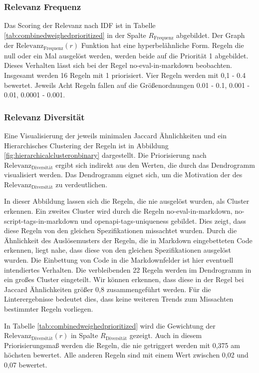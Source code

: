 \subsubsection{Relevanz Frequenz} \label{sec:iversesfrequenzscoring}
Das Scoring der Relevanz nach \acl{IDF} ist in Tabelle \ref{tab:combinedweighedprioritized} in der Spalte $R_\text{Frequenz}$ abgebildet. Der Graph der $\text{Relevanz}_\text{Frequenz}(r)$ Funktion hat eine hyperbelähnliche Form. Regeln die null oder ein Mal ausgelöst werden, werden beide auf die Priorität 1 abgebildet. Dieses Verhalten lässt sich bei der Regel no-eval-in-markdown beobachten. Insgesamt werden 16 Regeln mit 1 priorisiert. Vier Regeln werden mit 0,1 - 0.4 bewertet. Jeweils Acht Regeln fallen auf die Größenordnungen 0.01 - 0.1, 0.001 - 0.01, 0.0001 - 0.001.


\subsubsection{Relevanz Diversität} \label{sec:diversitätsscoring}
Eine Visualisierung der jeweils minimalen Jaccard Ähnlichkeiten und ein Hierarchisches Clustering der Regeln ist in Abbildung \ref{fig:hierarchicalclusteronbinary} dargestellt. Die Priorisierung nach $\text{Relevanz}_\text{Diversität}$ ergibt sich indirekt aus den Werten, die durch das Dendrogramm visualisiert werden. Das Dendrogramm eignet sich, um die Motivation der des $\text{Relevanz}_\text{Diversität}$ zu verdeutlichen.

In dieser Abbildung lassen sich die Regeln, die nie ausgelöst wurden, als Cluster erkennen. Ein zweites Cluster wird durch die Regeln no-eval-in-markdown, no-script-tags-in-markdown und openapi-tags-uniqueness gebildet. Dies zeigt, dass diese Regeln von den gleichen Spezifikationen missachtet wurden. Durch die Ähnlichkeit des Auslösemusters der Regeln, die in Markdown eingebetteten Code erkennen, liegt nahe, dass diese von den gleichen Spezifikationen ausgelöst wurden. Die Einbettung von Code in die Markdownfelder ist hier eventuell intendiertes Verhalten. Die verbleibenden 22 Regeln werden im Dendrogramm in ein großes Cluster eingeteilt. Wir können erkennen, dass diese in der Regel bei Jaccard Ähnlichkeiten größer 0,8 zusammengeführt werden. Für die Linterergebnisse bedeutet dies, dass keine weiteren Trends zum Missachten bestimmter Regeln vorliegen. 

In Tabelle \ref{tab:combinedweighedprioritized} wird die Gewichtung der $\text{Relevanz}_\text{Diversität}(r)$ in Spalte $R_\text{Diversität}$ gezeigt. Auch in diesem Priorisierungsmaß werden die Regeln, die nie getriggert werden mit 0,375 am höchsten bewertet. Alle anderen Regeln sind mit einem Wert zwischen 0,02 und 0,07 bewertet.


